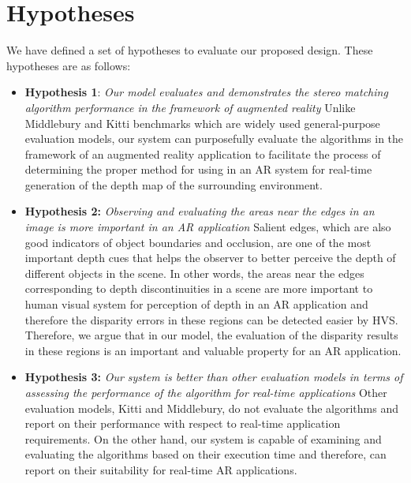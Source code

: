 \section{Hypotheses}

We have defined a set of hypotheses to evaluate our proposed design. These hypotheses are as follows:

\begin{itemize}
\item \textbf{Hypothesis 1}: \emph{Our model evaluates and demonstrates the stereo matching algorithm performance in the framework of augmented reality} 
Unlike Middlebury and Kitti benchmarks which are widely used general-purpose evaluation models, our system can purposefully evaluate the algorithms in the framework of an 
augmented reality application to facilitate the process of determining
the proper method for using in an AR system for real-time generation of the depth map of the surrounding environment.

\item \textbf{Hypothesis 2:} \emph{Observing and evaluating the areas near the edges in an image is more important in an AR application}
Salient edges, which are also good indicators of object boundaries and occlusion, are one of the 
most important depth cues that helps the observer to better perceive the depth of different objects in the scene. In other words, the areas near the edges corresponding to depth discontinuities
in a scene are more important to human visual system for perception of depth in an AR application and therefore the disparity 
errors in these regions can be detected easier by HVS. Therefore, we argue that in our model, the evaluation of the disparity results in these regions is 
an important and valuable property for an AR application.

\item \textbf{Hypothesis 3:} \emph{Our system is better than other evaluation models in terms of assessing the performance of the algorithm for real-time applications}  
Other evaluation models, Kitti and Middlebury, do not evaluate the algorithms and report on their performance
with respect to real-time application requirements. On the other hand, our system is capable of examining and evaluating the algorithms 
based on their execution time and therefore, can report on
their suitability for real-time AR applications.

\end{itemize}

